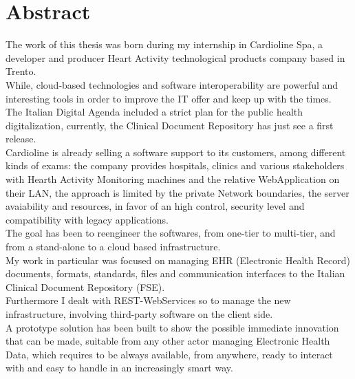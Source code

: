 \chapter*{Abstract} %
\label{abstract}

The work of this thesis was born during my internship in Cardioline Spa, a developer and producer Heart Activity technological products company based in Trento.\\While, cloud-based technologies and software interoperability are powerful and interesting tools in order to improve the IT offer and keep up with the times.\\The Italian Digital Agenda included a strict plan for the public health digitalization, currently, the Clinical Document Repository has just see a first release.\\Cardioline is already selling a software support to its customers, among different kinds of exams: the company provides hospitals, clinics and various stakeholders with Hearth Activity Monitoring machines and the relative WebApplication on their LAN, the approach is limited by the private Network boundaries, the server avaiability and resources, in favor of an high control, security level and compatibility with legacy applications.\\The goal has been to reengineer the softwares, from one-tier to multi-tier, and from a stand-alone to a cloud based infrastructure.\\My work in particular was focused on managing EHR (Electronic Health Record) documents, formats, standards, files and communication interfaces to the Italian Clinical Document Repository (FSE).\\Furthermore I dealt with REST-WebServices so to manage the new infrastructure, involving third-party software on the client side.\\A prototype solution has been built to show the possible immediate innovation that can be made, suitable from any other actor managing Electronic Health Data, which requires to be always available, from anywhere, ready to interact with and easy to handle in an increasingly smart way.